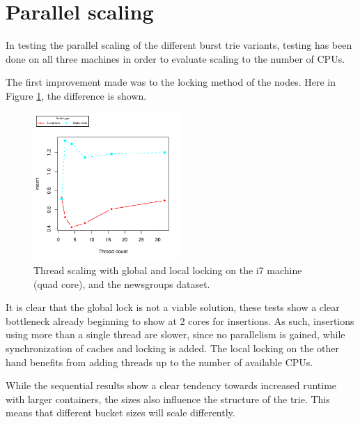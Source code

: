 \clearpage
\section{Parallel scaling}
In testing the parallel scaling of the different burst trie variants,
testing has been done on all three machines in order to evaluate scaling
to the number of CPUs.

The first improvement made was to the locking method of the nodes. Here in
Figure \ref{fig:globallock}, the difference is shown.
\begin{figure}[h!]
    \centering
    \includegraphics[width=0.5\textwidth]{plots/ts_locking}
    \caption{Thread scaling with global and local locking on the i7 machine (quad core),
    and the newsgroups dataset.}
    \label{fig:globallock}
\end{figure}
It is clear that the global lock is not a viable solution, these tests
show a clear bottleneck already beginning to show at 2 cores for insertions.
As such, insertions using more than a single thread are slower, since no
parallelism is gained, while synchronization of caches and locking is added.
The local locking on the other hand benefits from adding threads up to the
number of available CPUs.



While the sequential results show a clear tendency towards increased runtime
with larger containers, the sizes also influence the structure of the trie.
This means that different bucket sizes will scale differently.

